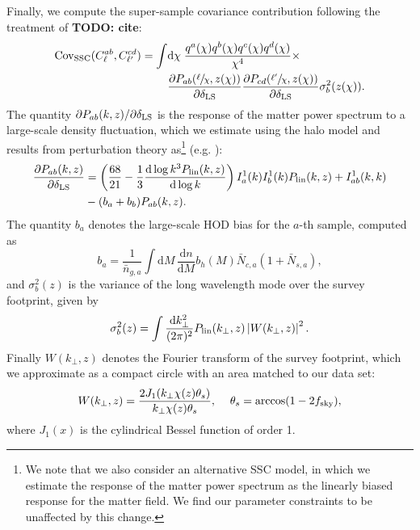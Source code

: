 \documentclass[a4paper,11pt]{article}
\newcommand{\todo}[1]{{\bf TODO: #1}}
\begin{document}
    Finally, we compute the super-sample covariance contribution following the treatment of \todo{cite}:
    \begin{align}
       \mathrm{Cov}_{\mathrm{SSC}}(C^{ab}_{\ell}, C^{cd}_{\ell'}) = \int & \mathrm{d}\chi \;\frac{q^{a}(\chi)q^{b}(\chi)q^{c}(\chi)q^{d}(\chi)}{\chi^{4}} \times \\ &\frac{\partial P_{ab}(\sfrac{\ell}{\chi}, z(\chi))}{\partial \delta_{\rm LS}}\frac{\partial P_{cd}(\sfrac{\ell'}{\chi}, z(\chi))}{\partial \delta_{\rm LS}}\sigma^{2}_{b}(z(\chi)).
    \end{align}
    The quantity $\partial P_{ab}(k, z)/\partial \delta_{\rm LS}$ is the response of the matter power spectrum to a large-scale density fluctuation, which we estimate using the halo model and results from perturbation theory as\footnote{We note that we also consider an alternative SSC model, in which we estimate the response of the matter power spectrum as the linearly biased response for the matter field. We find our parameter constraints to be unaffected by this change.} (e.g. \cite{Krause:2017}):
    \begin{align}
      \frac{\partial P_{ab}(k, z)}{\partial \delta_{\rm LS}} &= \left( \frac{68}{21} - \frac{1}{3}\frac{\mathrm{d}\log{k^{3} P_{\mathrm{lin}}}(k, z)}{\mathrm{d}\log k} \right) I_{a}^{1}(k)I_{b}^{1}(k)P_{\mathrm{lin}}(k, z) + I_{ab}^{1}(k, k) \\ &- (b_{a} + b_{b})P_{ab}(k, z).
    \end{align}
    The quantity $b_{a}$ denotes the large-scale HOD bias for the $a$-th sample, computed as
    \begin{equation}
      b_{a}=\frac{1}{\bar{n}_{g, a}}\int \mathrm{d}M\,\frac{\mathrm{d}n}{\mathrm{d}M}b_{h}(M) \bar{N}_{c, a}(1+\bar{N}_{s, a}),
    \end{equation}
    and $\sigma_b^2(z)$ is the variance of the long wavelength mode over the survey footprint, given by
    \begin{equation}
      \sigma_b^2(z) = \int \frac{\mathrm{d}k_\perp^2}{(2\pi)^2}P_{\rm lin}(k_\perp,z)\left|W(k_\perp,z)\right|^2.
    \end{equation}
    Finally $W(k_\perp,z)$ denotes the Fourier transform of the survey footprint, which we approximate as a compact circle with an area matched to our data set:
    \begin{equation}
      W(k_\perp,z)=\frac{2 J_1(k_\perp\chi(z)\theta_s)}{k_\perp \chi(z)\theta_s},\hspace{12pt} \theta_s={\rm arccos}(1-2f_{\rm sky}),
    \end{equation}
    where $J_1(x)$ is the cylindrical Bessel function of order 1.
    
\end{document}

